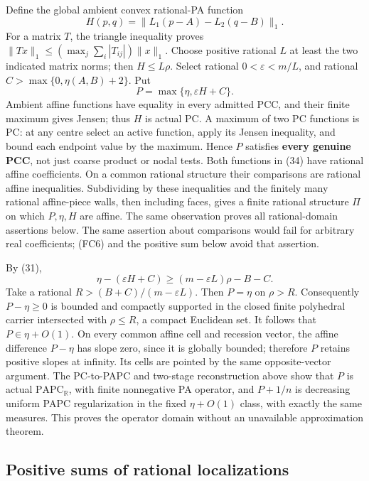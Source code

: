 \documentclass[
  11pt,
]{article}
\begin{document}
Define the global ambient convex rational-PA function \[
             H(p,q)=\|L_1(p-A)-L_2(q-B)\|_1.                 \tag{33}
\] For a matrix \(T\), the triangle inequality proves
\(\|Tx\|_1\leq(\max_j\sum_i|T_{ij}|)\|x\|_1\). Choose positive rational
\(L\) at least the two indicated matrix norms; then \(H\leq L\rho\).
Select rational \(0<\varepsilon<m/L\), and rational
\(C>\max\{0,\eta(A,B)+2\}\). Put \[
                  P=\max\{\eta,\varepsilon H+C\}.          \tag{34}
\] Ambient affine functions have equality in every admitted PCC, and
their finite maximum gives Jensen; thus \(H\) is actual PC. A maximum of
two PC functions is PC: at any centre select an active function, apply
its Jensen inequality, and bound each endpoint value by the maximum.
Hence \(P\) satisfies \textbf{every genuine PCC}, not just coarse
product or nodal tests. Both functions in (34) have rational affine
coefficients. On a common rational structure their comparisons are
rational affine inequalities. Subdividing by these inequalities and the
finitely many rational affine-piece walls, then including faces, gives a
finite rational structure \(\Pi\) on which \(P,\eta,H\) are affine. The
same observation proves all rational-domain assertions below. The same
assertion about comparisons would fail for arbitrary real coefficients;
(FC6) and the positive sum below avoid that assertion.

By (31), \[
 \eta-(\varepsilon H+C)\geq(m-\varepsilon L)\rho-B-C.
\] Take a rational \(R>(B+C)/(m-\varepsilon L)\). Then \(P=\eta\) on
\(\rho>R\). Consequently \(P-\eta\geq0\) is bounded and compactly
supported in the closed finite polyhedral carrier intersected with
\(\rho\leq R\), a compact Euclidean set. It follows that
\(P\in\eta+O(1)\). On every common affine cell and recession vector, the
affine difference \(P-\eta\) has slope zero, since it is globally
bounded; therefore \(P\) retains positive slopes at infinity. Its cells
are pointed by the same opposite-vector argument. The PC-to-PAPC and
two-stage reconstruction above show that \(P\) is actual
\(\mathrm{PAPC}_{\mathbb{R}}\), with finite nonnegative PA operator, and
\(P+1/n\) is decreasing uniform PAPC regularization in the fixed
\(\eta+O(1)\) class, with exactly the same measures. This proves the
operator domain without an unavailable approximation theorem.

\subsection{Positive sums of rational
localizations}\label{positive-sums-of-rational-localizations}
\end{document}
